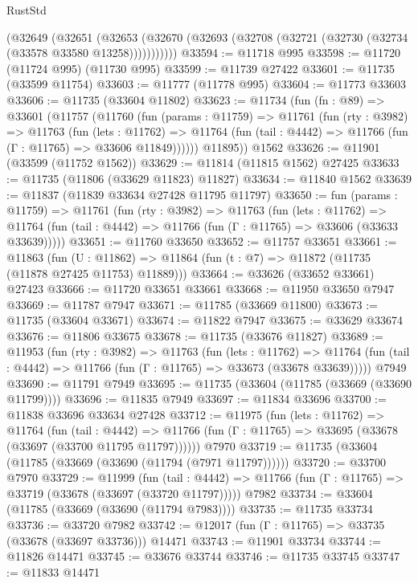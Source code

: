 \begin{lexlean}{RustStd}
\begin{coremodule}
      (@32649
        (@32651
          (@32653 (@32670 (@32693 (@32708 (@32721 (@32730 (@32734 (@33578 @33580 @13258)))))))))))
@33594 := @11718 @995
@33598 := @11720 (@11724 @995) (@11730 @995)
@33599 := @11739 @27422
@33601 := @11735 (@33599 @11754)
@33603 := @11777 (@11778 @995)
@33604 := @11773 @33603
@33606 := @11735 (@33604 @11802)
@33623 := @11734
    (fun (fn : @89) =>
    @33601
      (@11757
        (@11760
          (fun (params : @11759) =>
          @11761
            (fun (rty : @3982) =>
            @11763
              (fun (lets : @11762) =>
              @11764 (fun (tail : @4442) => @11766 (fun (Γ : @11765) => @33606 @11849))))))
        @11895))
    @1562
@33626 := @11901 (@33599 (@11752 @1562))
@33629 := @11814 (@11815 @1562) @27425
@33633 := @11735 (@11806 (@33629 @11823) @11827)
@33634 := @11840 @1562
@33639 := @11837 (@11839 @33634 @27428 @11795 @11797)
@33650 := fun (params : @11759) =>
  @11761
    (fun (rty : @3982) =>
    @11763
      (fun (lets : @11762) =>
      @11764 (fun (tail : @4442) => @11766 (fun (Γ : @11765) => @33606 (@33633 @33639)))))
@33651 := @11760 @33650
@33652 := @11757 @33651
@33661 := @11863
    (fun (U : @11862) => @11864 (fun (t : @7) => @11872 (@11735 (@11878 @27425 @11753) @11889)))
@33664 := @33626 (@33652 @33661) @27423
@33666 := @11720 @33651 @33661
@33668 := @11950 @33650 @7947
@33669 := @11787 @7947
@33671 := @11785 (@33669 @11800)
@33673 := @11735 (@33604 @33671)
@33674 := @11822 @7947
@33675 := @33629 @33674
@33676 := @11806 @33675
@33678 := @11735 (@33676 @11827)
@33689 := @11953
    (fun (rty : @3982) =>
    @11763
      (fun (lets : @11762) =>
      @11764 (fun (tail : @4442) => @11766 (fun (Γ : @11765) => @33673 (@33678 @33639)))))
    @7949
@33690 := @11791 @7949
@33695 := @11735 (@33604 (@11785 (@33669 (@33690 @11799))))
@33696 := @11835 @7949
@33697 := @11834 @33696
@33700 := @11838 @33696 @33634 @27428
@33712 := @11975
    (fun (lets : @11762) =>
    @11764
      (fun (tail : @4442) =>
      @11766 (fun (Γ : @11765) => @33695 (@33678 (@33697 (@33700 @11795 @11797))))))
    @7970
@33719 := @11735 (@33604 (@11785 (@33669 (@33690 (@11794 (@7971 @11797))))))
@33720 := @33700 @7970
@33729 := @11999
    (fun (tail : @4442) => @11766 (fun (Γ : @11765) => @33719 (@33678 (@33697 (@33720 @11797)))))
    @7982
@33734 := @33604 (@11785 (@33669 (@33690 (@11794 @7983))))
@33735 := @11735 @33734
@33736 := @33720 @7982
@33742 := @12017 (fun (Γ : @11765) => @33735 (@33678 (@33697 @33736))) @14471
@33743 := @11901 @33734
@33744 := @11826 @14471
@33745 := @33676 @33744
@33746 := @11735 @33745
@33747 := @11833 @14471

\end{coremodule}
\end{lexlean}
